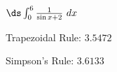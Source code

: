 {$\ds \int_{0}^{6} \frac{1}{\sin x+2} \ dx$}
{Trapezoidal Rule: 	$3.5472$

Simpson's Rule: $3.6133$
}